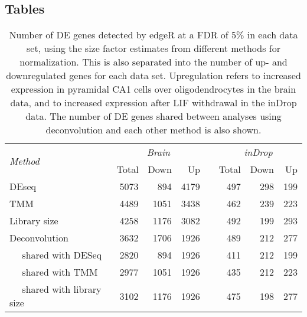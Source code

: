 \documentclass{bmcart}
\begin{document}
\begin{backmatter}

\section*{Tables}

\begin{table}[!h]
\caption{
    Number of DE genes detected by edgeR at a FDR of 5\% in each data set, using the size factor estimates from different methods for normalization.
    This is also separated into the number of up- and downregulated genes for each data set.
    Upregulation refers to increased expression in pyramidal CA1 cells over oligodendrocytes in the brain data, and to increased expression after LIF withdrawal in the inDrop data.
    The number of DE genes shared between analyses using deconvolution and each other method is also shown.
}
\begin{center}
\begin{tabular}{l r r r c r r r}
\hline
\multirow{2}{*}{\textit{Method}} & \multicolumn{3}{c}{\textit{Brain}} && \multicolumn{3}{c}{\textit{inDrop}}  \\
\cline{2-4}
\cline{6-8}
& Total & Down & Up && Total & Down & Up \\
\hline
DEseq                               & 5073 & 894  & 4179 && 497 & 298 & 199 \\
TMM                                 & 4489 & 1051 & 3438 && 462 & 239 & 223 \\
Library size                        & 4258 & 1176 & 3082 && 492 & 199 & 293 \\
Deconvolution                       & 3632 & 1706 & 1926 && 489 & 212 & 277 \\
$\quad$ shared with DESeq           & 2820 & 894  & 1926 && 411 & 212 & 199 \\
$\quad$ shared with TMM             & 2977 & 1051 & 1926 && 435 & 212 & 223 \\
$\quad$ shared with library size    & 3102 & 1176 & 1926 && 475 & 198 & 277 \\
\hline                                                   
\end{tabular}
\end{center}
\label{tab:real_de}
\end{table}



\end{backmatter}
\end{document}
